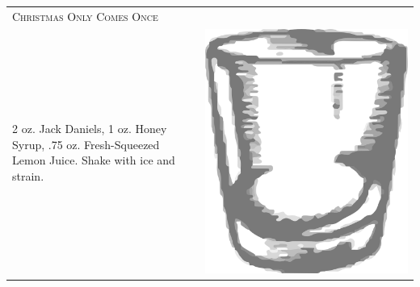 \documentclass{article}
\begin{document}
\begin{tabular}{p{2in} p{0.5in}}
\multicolumn{2}{p{3in}}{\centering\Huge\textsc{Christmas Only Comes Once}} \\ 
   \vspace{-0.1in}2 oz. Jack Daniels, 1 oz. Honey Syrup, .75 oz. Fresh-Squeezed Lemon Juice. Shake with ice and strain. &
   \vspace{-0.1in} \includegraphics{rocks_glass.png}
\end{tabular}
\end{document}
